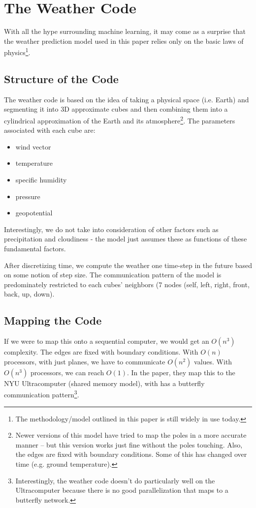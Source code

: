 \section{The Weather Code}

With all the hype surrounding machine learning, it may come as a surprise that the weather prediction model used in this paper relies only on the basic laws of physics\footnote{The methodology/model outlined in this paper is still widely in use today.}. 

\subsection{Structure of the Code}

The weather code is based on the idea of taking a physical space (i.e. Earth) and segmenting it into 3D approximate cubes and then combining them into a cylindrical approximation of the Earth and its atmosphere\footnote{Newer versions of this model have tried to map the poles in a more accurate manner -- but this version works just fine without the poles touching. Also, the edges are fixed with boundary conditions.
Some of this has changed over time (e.g. ground temperature).}. The parameters associated with each cube are:

\begin{itemize}
    \item wind vector
    \item temperature
    \item specific humidity
    \item pressure
    \item geopotential
\end{itemize}

Interestingly, we do not take into consideration of other factors such as precipitation and cloudiness - the model just assumes these as functions of these fundamental factors.

After discretizing time, we compute the weather one time-step in the future based on some notion of step size. The communication pattern of the model is predominately restricted to each cubes' neighbors (7 nodes (self, left, right, front, back, up, down).

\subsection{Mapping the Code}

If we were to map this onto a sequential computer, we would get an \( O(n^3) \) complexity.
The edges are fixed with boundary conditions. With \( O(n) \) processors, with just planes, we have to communicate \( O(n^2) \) values. With \( O(n^3) \) processors, we can reach \( O(1) \). In the paper, they map this to the NYU Ultracomputer (shared memory model), with has a butterfly communication pattern\footnote{Interestingly, the weather code doesn't do particularly well on the Ultracomputer because there is no good parallelization that maps to a butterfly network.}.

